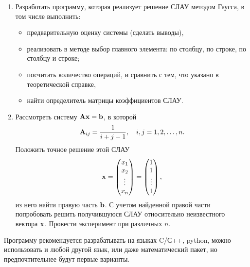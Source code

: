\documentclass[12pt]{article}
\begin{document}
	\begin{enumerate}
	    \item Разработать программу, которая реализует решение СЛАУ методом Гаусса, в том числе выполнить:
	    
	    \begin{itemize}
	        \item предварительную оценку системы (сделать выводы),
	        \item реализовать в методе выбор главного элемента: по столбцу, по строке, по столбцу и строке;
	        \item посчитать количество операций, и сравнить с тем, что указано в теоретической справке,
	        \item найти определитель матрицы коэффициентов СЛАУ.
	    \end{itemize}
	        
	    \item Рассмотреть систему $\bold{Ax}=\bold{b}$, в которой
	    \begin{equation}
	        \bold{A}_{ij}=\frac{1}{i+j-1},\quad i,j=1,2,\ldots,n.
	    \end{equation}
	    Положить точное решение этой СЛАУ
	    \begin{equation}
	        \bold{x}=\begin{pmatrix}
	            x_1 \\
	            x_2 \\
	             \vdots \\
	            x_n \\
	        \end{pmatrix}=
	        \begin{pmatrix}
	            1 \\
	            1 \\
	             \vdots \\
	             1
	        \end{pmatrix},
	    \end{equation}
	    из него найти правую часть $\bold{b}$. С учетом найденной правой части попробовать решить получившуюся СЛАУ относительно неизвестного вектора $\bold{x}$. Провести эксперимент при различных $n$.
	\end{enumerate}
	
    Программу рекомендуется разрабатывать на языках C/С++, python, можно использовать и любой другой язык, или даже математический пакет, но предпочтительнее будут первые варианты.
\end{document}
